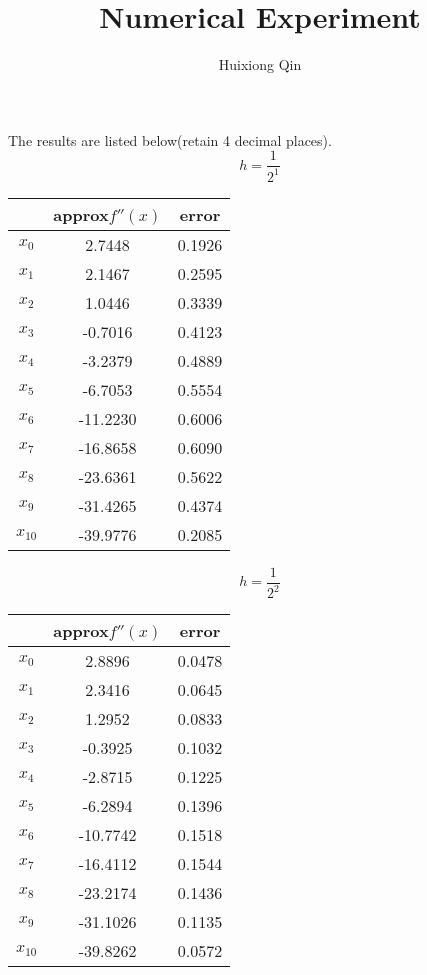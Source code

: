 \documentclass{article}
\author{Huixiong Qin}
\title{Numerical Experiment}
\begin{document}
\maketitle

\section{}
The results are listed below(retain 4 decimal places).\\
$$h=\frac1{2^1}$$
\begin{center}
\begin{tabular}{|c|c|c|}
  \hline
        & approx$f''(x)$ &error\\
  \hline
  $x_0$ & 2.7448  &0.1926\\
  $x_1$ & 2.1467  &0.2595\\
  $x_2$ & 1.0446 &0.3339\\
  $x_3$ & -0.7016 &0.4123\\
  $x_4$ & -3.2379 &0.4889\\
  $x_5$ & -6.7053 &0.5554\\
  $x_6$ & -11.2230 &0.6006\\
  $x_7$ & -16.8658 &0.6090\\
  $x_8$ & -23.6361 &0.5622\\
  $x_9$ & -31.4265 &0.4374\\
  $x_{10}$ & -39.9776 &0.2085\\
  \hline
\end{tabular}
\end{center}

$$h=\frac1{2^2}$$
\begin{center}
\begin{tabular}{|c|c|c|}
  \hline
        & approx$f''(x)$ &error\\
  \hline
  $x_0$ & 2.8896  &0.0478\\
  $x_1$ & 2.3416  &0.0645\\
  $x_2$ & 1.2952 &0.0833\\
  $x_3$ & -0.3925 &0.1032\\
  $x_4$ & -2.8715 &0.1225\\
  $x_5$ & -6.2894 &0.1396\\
  $x_6$ & -10.7742 &0.1518\\
  $x_7$ & -16.4112 &0.1544\\
  $x_8$ & -23.2174 &0.1436\\
  $x_9$ & -31.1026 &0.1135\\
  $x_{10}$ & -39.8262 &0.0572\\
  \hline
\end{tabular}
\end{center}
\end{document}
